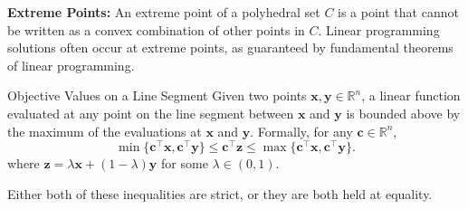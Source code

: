 %
%
%
%
%
%
%

\textbf{Extreme Points:}  
An extreme point of a polyhedral set \(C\) is a point that cannot be written as a convex combination of other points in \(C\). Linear programming solutions often occur at extreme points, as guaranteed by fundamental theorems of linear programming.

\begin{lemma}{Objective Values on a Line Segment}{}
\label{lemma:objective_bound}
Given two points \(\mathbf{x}, \mathbf{y} \in \mathbb{R}^n\), a linear function evaluated at any point on the line segment between \(\mathbf{x}\) and \(\mathbf{y}\) is bounded above by the maximum of the evaluations at \(\mathbf{x}\) and \(\mathbf{y}\). Formally, for any \(\mathbf{c} \in \mathbb{R}^n\),
\[
\min\{\mathbf{c}^\top \mathbf{x}, \mathbf{c}^\top \mathbf{y}\} \leq \mathbf{c}^\top \mathbf{z} \leq \max\{\mathbf{c}^\top \mathbf{x}, \mathbf{c}^\top \mathbf{y}\}.
\]
where \(\mathbf{z} = \lambda \mathbf{x} + (1-\lambda) \mathbf{y}\) for some $\lambda \in (0,1)$.

Either both of these inequalities are strict, or they are both held at equality.
\end{lemma}

